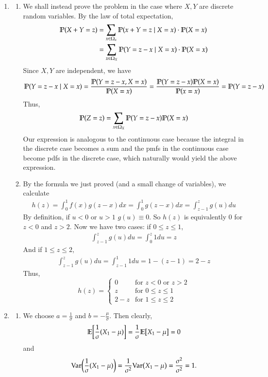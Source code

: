 \documentclass[12pt]{article}
\theoremstyle{definitionstyle}
\renewcommand{\P}{\mathbb P\qty}
\newcommand{\E}{\mathbb{E}\qty}
\newcommand{\Var}{\mathrm{Var}\qty}
\begin{document}
\begin{enumerate}[leftmargin=\labelsep]
		\item \begin{enumerate}
			\item We shall instead prove the problem in the case where $X,Y$ are discrete random variables. By the law of total expectation,
			\begin{align*}
				\P(X+Y=z) &= \sum_{x \in \Omega_x} \P(x+Y = z \mid X = x) \cdot \P(X = x) \\
				&= \sum_{x \in \Omega_X} \P(Y = z-x \mid X = x) \cdot \P(X=x)
			\end{align*}
			Since $X,Y$ are independent, we have
			\begin{align*}
				\P(Y=z-x \mid X=x) = \frac{\P(Y=z-x, X=x)}{\P(X=x)} = \frac{\P(Y=z-x)\P(X=x)}{\P(x=x)} = \P(Y=z-x)
			\end{align*}
			Thus,
			\begin{align*}
				\P(Z=z) = \sum_{x \in \Omega_X} \P(Y=z-x)\P(X=x)
			\end{align*}
			Our expression is analogous to the continuous case because the integral in the discrete case becomes a sum and the pmfs in the continuous case become pdfs in the discrete case, which naturally would yield the above expression.
			
		
			\item By the formula we just proved (and a small change of variables), we calculate
			\begin{align*}
				h(z) = \int_0^1 f(x)g(z-x)dx = \int_0^1 g(z-x)dx = \int_{z-1}^z g(u)du
			\end{align*}
			By definition, if $u < 0$ or $u > 1$ $g(u) \equiv 0$. So $h(z)$ is equivalently 0 for $z < 0$ and $z > 2$. Now we have two cases: if $0 \leq z \leq 1$,
			\begin{align*}
				\int_{z-1}^z g(u)du = \int_0^z 1du = z
			\end{align*}
			And if $1 \leq z \leq 2$,
			\begin{align*}
				\int_{z-1}^z g(u)du = \int_{z-1}^1 1du = 1 - (z-1) = 2-z
			\end{align*}
			Thus,
			\[ h(z) = \begin{cases}
				0 & \text{for } z < 0 \text{ or } z > 2 \\
				z & \text{for } 0 \leq z \leq 1 \\
				2 - z & \text{for } 1 \leq z \leq 2
			\end{cases} \]
		\end{enumerate}
		\item \begin{enumerate}
			\item We choose $a = \frac1\sigma$ and $b = -\frac{\mu}{\sigma}$. Then clearly,
			\begin{align*}
				\E[\frac{1}{\sigma}(X_1-\mu)] = \frac{1}{\sigma}\E[X_1-\mu] = 0
			\end{align*}
			and
			\begin{align*}
				\Var(\frac{1}{\sigma}(X_1-\mu)) = \frac{1}{\sigma^2} \Var(X_1-\mu) = \frac{\sigma^2}{\sigma^2} = 1.
			\end{align*}
		

\end{enumerate}
\end{enumerate}
\end{document}
